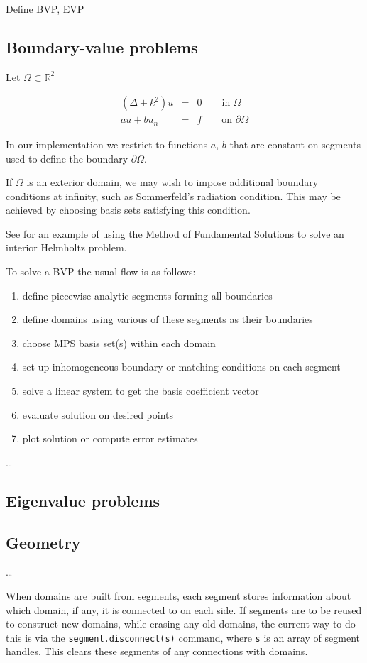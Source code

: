 \documentclass[12pt]{article}
\newcommand{\ben}{\begin{enumerate}}
\newcommand{\een}{\end{enumerate}}
\newcommand{\bea}{\begin{eqnarray}}
\newcommand{\eea}{\end{eqnarray}}
\newcommand{\pO}{{\partial\Omega}}
\begin{document}
Define BVP, EVP

\subsection{Boundary-value problems}

Let $\Omega \subset \mathbb{R}^2$

\bea
(\Delta+k^2)u& =& 0 \qquad \mbox{in } \Omega\\
au + b u_n&=&f\qquad \mbox{on } \pO
\eea

In our implementation we restrict to functions $a$, $b$ that are
constant on segments used to define the boundary $\pO$.

If $\Omega$ is an exterior domain, we may wish to impose
additional boundary conditions at infinity, such as Sommerfeld's
radiation condition.
This may be achieved by choosing basis sets satisfying this condition.

See \cite{mfs} for
an example of using the Method of Fundamental Solutions to solve
an interior Helmholtz problem.

To solve a BVP the usual flow is as follows:

\ben
\item define piecewise-analytic segments forming all boundaries
\item define domains using various of these segments as their boundaries
\item choose MPS basis set(s) within each domain
\item set up inhomogeneous boundary or matching conditions on each segment
\item solve a %
linear system to get the basis coefficient vector
\item evaluate solution on desired points
\item plot solution or compute error estimates
\een

\ldots

\subsection{Eigenvalue problems}




\subsection{Geometry}

\ldots

When domains are built from segments, each segment stores information about
which domain, if any, it is connected to on each side.
If segments are to be reused to construct new domains, while erasing any
old domains, the current way to do this is via the {\tt segment.disconnect(s)}
command, where {\tt s} is an array of segment handles. This clears
these segments of any connections with domains.
\end{document}
